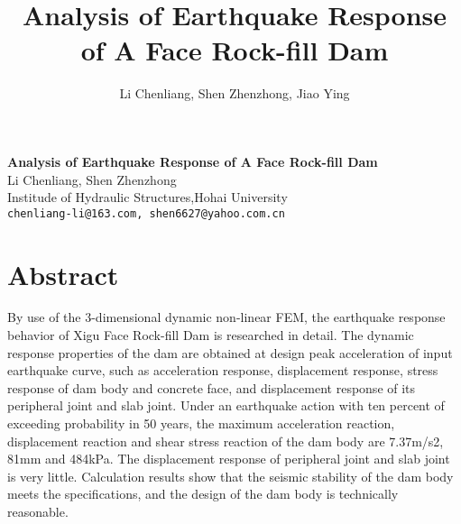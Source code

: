 \title{Analysis of Earthquake Response of A Face Rock-fill Dam}
\author{Li Chenliang, Shen Zhenzhong, Jiao Ying} 

\begin{center}

\textbf{\Large Analysis of Earthquake Response of A Face Rock-fill Dam}\\
\vspace{10mm}
{\large Li Chenliang, Shen Zhenzhong}\\
Institude of Hydraulic Structures,Hohai University\\
{\tt chenliang-li@163.com, shen6627@yahoo.com.cn}

\end{center}

\section*{Abstract}

By use of the 3-dimensional dynamic non-linear FEM, the earthquake response behavior of Xigu Face Rock-fill Dam is researched in detail. The dynamic response properties of the dam are obtained at design peak acceleration of input earthquake curve, such as acceleration response, displacement response, stress response of dam body and concrete face, and displacement response of its peripheral joint and slab joint. Under an earthquake action with ten percent of exceeding probability in 50 years, the maximum acceleration reaction, displacement reaction and shear stress reaction of the dam body are 7.37m/s2, 81mm and 484kPa. The displacement response of peripheral joint and slab joint is very little. Calculation results show that the seismic stability of the dam body meets the specifications, and the design of the dam body is technically reasonable.

